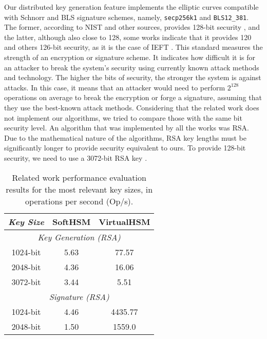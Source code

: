 Our distributed key generation feature implements the elliptic curves compatible with Schnorr and BLS signature schemes, namely, \texttt{secp256k1} and \texttt{BLS12\_381}. The former, according to NIST and other sources, provides 128-bit security \cite{nistp256security,cryptobook}, and the latter, although also close to 128, some works indicate that it provides 120 \cite{nccblssecurity} and others 126-bit security, as it is the case of IEFT \cite{blsdraft}. This standard measures the strength of an encryption or signature scheme. It indicates how difficult it is for an attacker to break the system's security using currently known attack methods and technology. The higher the bits of security, the stronger the system is against attacks. In this case, it means that an attacker would need to perform $2^{128}$ operations on average to break the encryption or forge a signature, assuming that they use the best-known attack methods. Considering that the related work does not implement our algorithms, we tried to compare those with the same bit security level. An algorithm that was implemented by all the works was RSA. Due to the mathematical nature of the algorithms, RSA key lengths must be significantly longer to provide security equivalent to ours. To provide 128-bit security, we need to use a 3072-bit RSA key \cite{nistrsasecurity}.


\setlength{\tabcolsep}{10pt}
\renewcommand{\arraystretch}{1.4}
\begin{table}[h]
\caption{Related work performance evaluation results for the most relevant key sizes, in operations per second (Op/s).}
\label{tab:related-work-results}
\centering
\begin{tabular}{|ccc|}
\hline
\multicolumn{1}{|c|}{\textit{Key Size}} & \multicolumn{1}{c|}{SoftHSM} & \multicolumn{1}{c|}{VirtualHSM} \\ \hline
\multicolumn{3}{|c|}{\textit{Key Generation (RSA)}} \\ \hline
\multicolumn{1}{|c|}{1024-bit} &  \multicolumn{1}{c|}{5.63} & \multicolumn{1}{c|}{77.57} \\ \hline
\multicolumn{1}{|c|}{2048-bit} &  \multicolumn{1}{c|}{4.36} & \multicolumn{1}{c|}{16.06} \\ \hline
\multicolumn{1}{|c|}{3072-bit} &  \multicolumn{1}{c|}{3.44} & \multicolumn{1}{c|}{5.51} \\ \hline
\multicolumn{3}{|c|}{\textit{Signature (RSA)}} \\ \hline
\multicolumn{1}{|c|}{1024-bit} & \multicolumn{1}{c|}{4.46} & \multicolumn{1}{c|}{4435.77} \\ \cline{1-3}
\multicolumn{1}{|c|}{2048-bit} & \multicolumn{1}{c|}{1.50} & \multicolumn{1}{c|}{1559.0} \\ \hline
\end{tabular}
\end{table}

